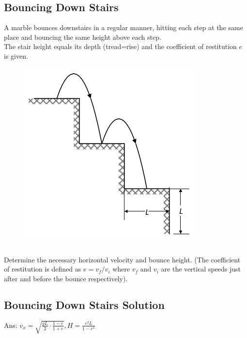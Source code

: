 \documentclass{article}
\begin{document}
\subsection{Bouncing Down Stairs}
A marble bounces downstairs in a regular manner, hitting each step at the same place and bouncing the same height above each step.\\[5pt]
The stair height equals its depth (tread=rise) and the coefficient of restitution $e$ is given.\\[5pt]
\begin{figure}[h]
    \centering
\includegraphics[width=0.8\linewidth]{images/bouncingdownstairs.png}
\end{figure}\\
Determine the necessary horizontal velocity and bounce height.
(The coefficient of restitution is defined as $e=v_f / v_i$ where $v_f$ and $v_i$ are the vertical speeds just after and before the bounce respectively). \\[10pt]
\clearpage
\subsection{Bouncing Down Stairs Solution}
Ans: $v_x=\sqrt{\frac{g L}{2} \cdot \frac{1-e}{1+e}}, H=\frac{e^2 L}{1-e^2}$
\clearpage 
\end{document}
